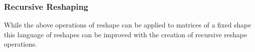 \begin{code}%
\>[2][@{}l@{\AgdaIndent{1}}]%
\>[4]\AgdaSpace{}%
\AgdaSymbol{:}\<%
\\
\>[4][@{}l@{\AgdaIndent{0}}]%
\>[6]%
\>[946I]\AgdaSymbol{(}\AgdaSpace{}%
\AgdaSymbol{:}\AgdaSpace{}%
\AgdaSpace{}%
\AgdaSpace{}%
\AgdaSymbol{)}\<%
\\
\>[.][@{}l@{}]\<[946I]%
\>[8]\AgdaSymbol{(}\AgdaSpace{}%
\AgdaSymbol{:}\AgdaSpace{}%
\AgdaSpace{}%
\AgdaSpace{}%
\AgdaSymbol{)}\<%
\\
%
\>[6]\AgdaComment{---------------------}\<%
\\
%
\>[6]\AgdaSpace{}%
\AgdaSpace{}%
\AgdaSpace{}%
\AgdaSpace{}%
\AgdaSpace{}%
\AgdaSpace{}%
\AgdaSpace{}%
\AgdaSpace{}%
\AgdaSpace{}%
\<%
\\
%
\\[\AgdaEmptyExtraSkip]%
%
\>[4]\AgdaSpace{}%
\AgdaSymbol{:}\<%
\\
\>[4][@{}l@{\AgdaIndent{0}}]%
\>[6]%
\>[965I]\AgdaSymbol{(}\AgdaSpace{}%
\AgdaSymbol{:}\AgdaSpace{}%
\AgdaSpace{}%
\AgdaSpace{}%
\AgdaSymbol{)}\<%
\\
\>[.][@{}l@{}]\<[965I]%
\>[8]\AgdaSymbol{(}\AgdaSpace{}%
\AgdaSymbol{:}\AgdaSpace{}%
\AgdaSpace{}%
\AgdaSpace{}%
\AgdaSymbol{)}\<%
\\
%
\>[6]\AgdaComment{-----------------------------}\<%
\\
%
\>[6]\AgdaSpace{}%
\AgdaSpace{}%
\AgdaSpace{}%
\AgdaSpace{}%
\AgdaSymbol{(}\AgdaSpace{}%
\AgdaSymbol{)}\AgdaSpace{}%
\AgdaSpace{}%
\AgdaSpace{}%
\AgdaSpace{}%
\AgdaSpace{}%
\AgdaSpace{}%
\<%
\end{code}

\subsubsection{Recursive Reshaping}
While the above operations of reshape can be applied to matrices of a fixed shape
this language of reshapes can be improved with the creation of recursive reshape
operations.

